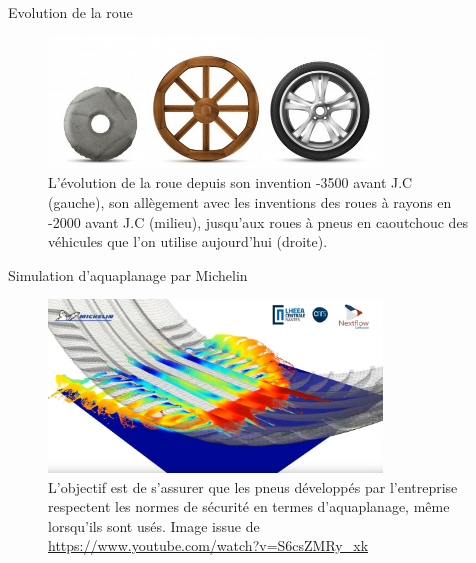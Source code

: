 \begin{frame}{Evolution de la roue}
    \begin{figure}
        \centering
        \includegraphics[width=0.79\textwidth]{img/plagiat/evolution-roue.jpg}
        \caption{
        L'évolution de la roue depuis son invention -3500 avant J.C (gauche), son allègement avec les inventions des roues à rayons en -2000 avant J.C (milieu), jusqu'aux roues à pneus en caoutchouc des véhicules que l'on utilise aujourd'hui (droite).
        }
        \label{fig:invention_roue}
    \end{figure}
\end{frame}
\begin{frame}{Simulation d'aquaplanage par Michelin}
    \begin{figure}
        \centering
        \includegraphics[width=0.79\textwidth]{img/plagiat/simulation_pneumatique_michelin.PNG}
        \caption{
            L'objectif est de s'assurer que les pneus développés par l'entreprise respectent les normes de sécurité en termes d'aquaplanage, 
            même lorsqu'ils sont usés. Image issue de \url{https://www.youtube.com/watch?v=S6csZMRy_xk}
        }
        \label{fig:simu_michelin}
    \end{figure}
\end{frame}


